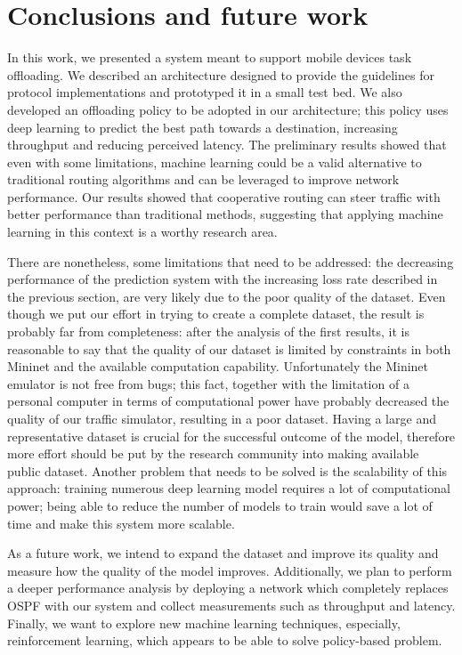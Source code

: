 \chapter{Conclusions and future work}\label{ch:conclusion}
In this work, we presented a system meant to support mobile devices task offloading. We described an architecture designed to provide the guidelines for protocol implementations and prototyped it in a small test bed. We also developed an offloading policy to be adopted in our architecture; this policy uses deep learning to predict the best path towards a destination, increasing throughput and reducing perceived latency. The preliminary results showed that even with some limitations, machine learning could be a valid alternative to traditional routing algorithms and can be leveraged to improve network performance. Our results showed that cooperative routing can steer traffic with better performance than traditional methods, suggesting that applying machine learning in this context is a worthy research area. 

There are nonetheless, some limitations that need to be addressed: the decreasing performance of the prediction system with the increasing loss rate described in the previous section, are very likely due to the poor quality of the dataset. Even though we put our effort in trying to create a complete dataset, the result is probably far from completeness: after the analysis of the first results, it is reasonable to say that the quality of our dataset is limited by constraints in both Mininet and the available computation capability. Unfortunately the Mininet emulator is not free from bugs; this fact, together with the limitation of a personal computer in terms of computational power have probably decreased the quality of our traffic simulator, resulting in a poor dataset. Having a large and representative dataset is crucial for the successful outcome of the model, therefore more effort should be put by the research community into making available public dataset. Another problem that needs to be solved is the scalability of this approach: training numerous deep learning model requires a lot of computational power; being able to reduce the number of models to train would save a lot of time and make this system more scalable.

As a future work, we intend to expand the dataset and improve its quality and measure how the quality of the model improves. Additionally, we plan to perform a deeper performance analysis by deploying a network which completely replaces OSPF with our system and collect measurements such as throughput and latency. Finally, we want to explore new machine learning techniques, especially, reinforcement learning, which appears to be able to solve policy-based problem.